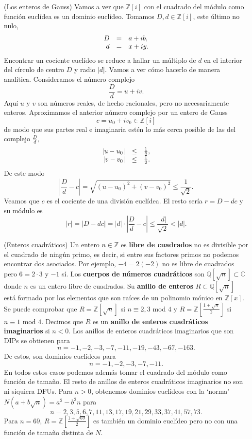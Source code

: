 \textrm{\normalfont (Los enteros de Gauss)} Vamos a ver
que \(\mathbb{Z}[i]\) con el cuadrado del módulo como función euclídea
es un dominio euclídeo. Tomamos \(D,d\in\mathbb{Z}[i]\), este último no
nulo,\[\begin{array}{rcl}D&=&a+ib,\cr d&=& x+iy.\cr \end{array}\]
Encontrar un cociente euclídeo se reduce a hallar un múltiplo de \(d\)
en el interior del círculo de centro \(D\) y radio \(|d|\). Vamos a ver
cómo hacerlo de manera analítica. Consideramos el número complejo
\[\frac{D}{d}=u+iv.\] Aquí \(u\) y \(v\) son números reales, de hecho
racionales, pero no necesariamente enteros. Aproximamos el anterior
número complejo por un entero de Gauss \[c=u_0+iv_0\in\mathbb Z[i]\] de
modo que sus partes real e imaginaria estén lo más cerca posible de las
del complejo \(\frac{D}{d}\),
\[\begin{array}{rcl} |u-u_0|&\leq &\frac{1}{2},\cr |v-v_0|&\leq &\frac{1}{2}. \end{array}\]
De este modo
\[\left|\frac{D}{d}-c\right|=\sqrt{(u-u_0)^2+(v-v_0)^2}\leq \frac{1}{\sqrt{2}}.\]
Veamos que \(c\) es el cociente de una división euclídea. El resto sería
\(r=D-dc\) y su módulo es
\[|r|=|D-dc|=|d|\cdot \left|\frac{D}{d}-c\right|\leq \frac{|d|}{\sqrt{2}}<|d|.\]

\textrm{\normalfont (Enteros cuadráticos)} Un entero
\(n\in\mathbb Z\) es \textbf{libre de cuadrados} no es divisible por el
cuadrado de ningún primo, es decir, si entre sus factores primos no
podemos encontrar dos asociados. Por ejemplo, \(-4=2(-2)\) no es libre
de cuadrados pero \(6=2\cdot 3\) y \(-1\) sí. Los \textbf{cuerpos de
números cuadráticos} son \(\mathbb Q[\sqrt{n}]\subset\mathbb C\) donde
\(n\) es un entero libre de cuadrados. Su \textbf{anillo de enteros}
\(R\subset\mathbb Q[\sqrt{n}]\) está formado por los elementos que son
raíces de un polinomio mónico en \(\mathbb Z[x]\). Se puede comprobar
que \(R=\mathbb Z[\sqrt{n}]\) si \(n\equiv 2,3\) mod \(4\) y
\(R=\mathbb Z[\frac{1+\sqrt{n}}{2}]\) si \(n\equiv 1\) mod \(4\).
Decimos que \(R\) es un \textbf{anillo de enteros cuadráticos
imaginarios} si \(n{<}0\). Los anillos de enteros cuadráticos
imaginarios que son DIPs se obtienen para
\[n=-1, -2, -3, -7, -11, -19, -43, -67, -163.\] De estos, son dominios
euclídeos para \[n=-1, -2, -3, -7, -11.\] En todos estos casos podemos
además tomar el cuadrado del módulo como función de tamaño. El resto de
anillos de enteros cuadráticos imaginarios no son ni siquiera DFUs. Para
\(n{>}0\), obtenemos dominios euclídeos con la `norma'
\(N(a+b\sqrt{n})=a^2-b^2n\) para
\[n=2, 3, 5, 6, 7, 11, 13, 17, 19, 21, 29, 33, 37, 41, 57, 73.\] Para
\(n=69\), \(R=\mathbb Z[\frac{1+\sqrt{69}}{2}]\) es también un dominio
euclídeo pero no con una función de tamaño distinta de \(N\).

